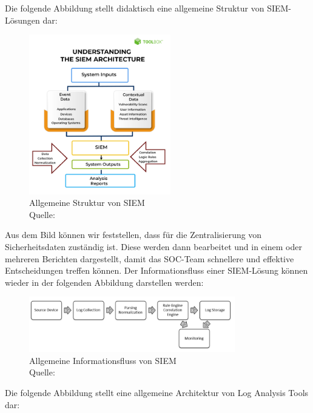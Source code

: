 Die folgende Abbildung stellt didaktisch eine allgemeine Struktur von \gls{SIEM}-Lösungen dar:

\begin{figure}[H]
   \centering
   \includegraphics[width=0.55\textwidth]{assets/2_p1.png}
   \caption{Allgemeine Struktur von \gls{SIEM} \\Quelle: \citep{Mohanan_What} }
   \label{fig:SIEM_Allg_Struktur}
   \centering
\end{figure}

\newpage
Aus dem Bild können wir feststellen, dass  für die Zentralisierung von Sicherheitsdaten zuständig ist. Diese werden dann bearbeitet und in einem oder mehreren Berichten dargestellt, damit das \gls{SOC}-Team schnellere und effektive Entscheidungen treffen können. Der Informationsfluss einer \gls{SIEM}-Lösung können wieder in der folgenden Abbildung darstellen werden:

\begin{figure}[H]
   \centering
   \includegraphics[width=0.8\textwidth]{assets/2_p2.png}
   \caption{Allgemeine Informationsfluss von \gls{SIEM} \\Quelle: \citep{Granadillo_SIEM} }
   \label{fig:SIEM_Allg_Informationsfluss}
   \centering
\end{figure}

Die folgende Abbildung stellt eine allgemeine Architektur von Log Analysis Tools dar:

